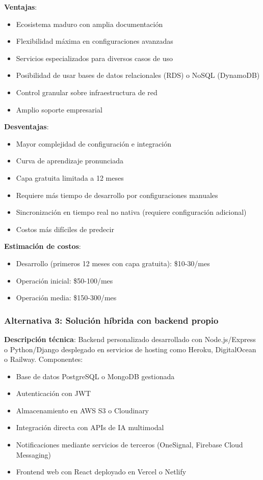 \textbf{Ventajas}:
\begin{itemize}
    \item Ecosistema maduro con amplia documentación
    \item Flexibilidad máxima en configuraciones avanzadas
    \item Servicios especializados para diversos casos de uso
    \item Posibilidad de usar bases de datos relacionales (RDS) o NoSQL (DynamoDB)
    \item Control granular sobre infraestructura de red
    \item Amplio soporte empresarial
\end{itemize}

\textbf{Desventajas}:
\begin{itemize}
    \item Mayor complejidad de configuración e integración
    \item Curva de aprendizaje pronunciada
    \item Capa gratuita limitada a 12 meses
    \item Requiere más tiempo de desarrollo por configuraciones manuales
    \item Sincronización en tiempo real no nativa (requiere configuración adicional)
    \item Costos más difíciles de predecir
\end{itemize}

\textbf{Estimación de costos}:
\begin{itemize}
    \item Desarrollo (primeros 12 meses con capa gratuita): \$10-30/mes
    \item Operación inicial: \$50-100/mes
    \item Operación media: \$150-300/mes
\end{itemize}

\subsubsection{Alternativa 3: Solución híbrida con backend propio}

\textbf{Descripción técnica}: Backend personalizado desarrollado con Node.js/Express o Python/Django desplegado en servicios de hosting como Heroku, DigitalOcean o Railway. Componentes:

\begin{itemize}
    \item Base de datos PostgreSQL o MongoDB gestionada
    \item Autenticación con JWT
    \item Almacenamiento en AWS S3 o Cloudinary
    \item Integración directa con APIs de IA multimodal
    \item Notificaciones mediante servicios de terceros (OneSignal, Firebase Cloud Messaging)
    \item Frontend web con React deployado en Vercel o Netlify
\end{itemize}

